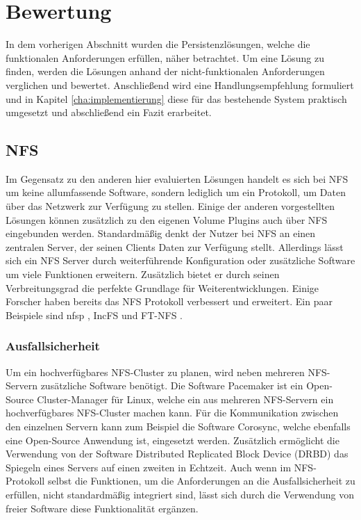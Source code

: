 \section{Bewertung}
In dem vorherigen Abschnitt wurden die Persistenzlösungen, welche die funktionalen Anforderungen erfüllen, näher betrachtet. Um eine Lösung zu finden, werden die Lösungen anhand der nicht-funktionalen Anforderungen verglichen und bewertet. Anschließend wird eine Handlungsempfehlung formuliert und in Kapitel \ref{cha:implementierung} diese für das bestehende System praktisch umgesetzt und abschließend ein Fazit erarbeitet.

\subsection{NFS}
Im Gegensatz zu den anderen hier evaluierten Lösungen handelt es sich bei \ac{NFS} um keine allumfassende Software, sondern lediglich um ein Protokoll, um Daten über das Netzwerk zur Verfügung zu stellen. Einige der anderen vorgestellten Lösungen können zusätzlich zu den eigenen Volume Plugins auch über \ac{NFS} eingebunden werden. Standardmäßig denkt der Nutzer bei \ac{NFS} an einen zentralen Server, der seinen Clients Daten zur Verfügung stellt. Allerdings lässt sich ein \ac{NFS} Server durch weiterführende Konfiguration oder zusätzliche Software um viele Funktionen erweitern. 
Zusätzlich bietet er durch seinen Verbreitungsgrad die perfekte Grundlage für Weiterentwicklungen. Einige Forscher haben bereits das NFS Protokoll verbessert und erweitert. Ein paar Beispiele sind nfsp \cite{Lombard2002Nfsp:Workstations}, IncFS \cite{Yi2006IncFS:NFS} und FT-NFS \cite{Peyrouze1996FT-NFS:Workstations}.

\subsubsection{Ausfallsicherheit}
Um ein hochverfügbares \ac{NFS}-Cluster zu planen, wird neben mehreren \ac{NFS}-Servern zusätzliche Software benötigt. Die Software Pacemaker ist ein Open-Source Cluster-Manager für Linux, welche ein aus mehreren \ac{NFS}-Servern ein hochverfügbares \ac{NFS}-Cluster machen kann. Für die Kommunikation zwischen den einzelnen Servern kann zum Beispiel die Software Corosync, welche ebenfalls eine Open-Source Anwendung ist, eingesetzt werden. Zusätzlich ermöglicht die Verwendung von der Software Distributed Replicated Block Device (DRBD) das Spiegeln eines Servers auf einen zweiten in Echtzeit.
Auch wenn im \ac{NFS}-Protokoll selbst die Funktionen, um die Anforderungen an die Ausfallsicherheit zu erfüllen, nicht standardmäßig integriert sind, lässt sich durch die Verwendung von freier Software diese Funktionalität ergänzen.

